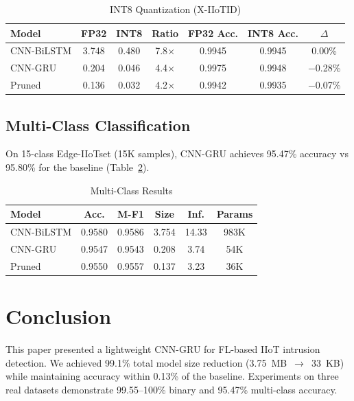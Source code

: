 \documentclass[12pt,a4paper]{article}
\begin{document}
\begin{table}[hbt]
\centering
\caption{INT8 Quantization (X-IIoTID)}
\label{tab:quant}
\begin{tabular}{lcccccc}
\toprule
Model & FP32 & INT8 & Ratio & FP32 Acc. & INT8 Acc. & $\Delta$ \\
\midrule
CNN-BiLSTM & 3.748 & 0.480 & 7.8$\times$ & 0.9945 & 0.9945 & 0.00\% \\
CNN-GRU & 0.204 & 0.046 & 4.4$\times$ & 0.9975 & 0.9948 & $-$0.28\% \\
Pruned & 0.136 & 0.032 & 4.2$\times$ & 0.9942 & 0.9935 & $-$0.07\% \\
\bottomrule
\end{tabular}
\end{table}

\subsection{Multi-Class Classification}

On 15-class Edge-IIoTset (15K samples), CNN-GRU achieves 95.47\% accuracy vs 95.80\% for the baseline (Table~\ref{tab:multiclass}).

\begin{table}[hbt]
\centering
\caption{Multi-Class Results}
\label{tab:multiclass}
\begin{tabular}{lccccc}
\toprule
Model & Acc. & M-F1 & Size & Inf. & Params \\
\midrule
CNN-BiLSTM & 0.9580 & 0.9586 & 3.754 & 14.33 & 983K \\
CNN-GRU & 0.9547 & 0.9543 & 0.208 & 3.74 & 54K \\
Pruned & 0.9550 & 0.9557 & 0.137 & 3.23 & 36K \\
\bottomrule
\end{tabular}
\end{table}

\section{Conclusion}

This paper presented a lightweight CNN-GRU for FL-based IIoT intrusion detection. We achieved 99.1\% total model size reduction (3.75~MB~$\rightarrow$~33~KB) while maintaining accuracy within 0.13\% of the baseline. Experiments on three real datasets demonstrate 99.55--100\% binary and 95.47\% multi-class accuracy.
\end{document}
